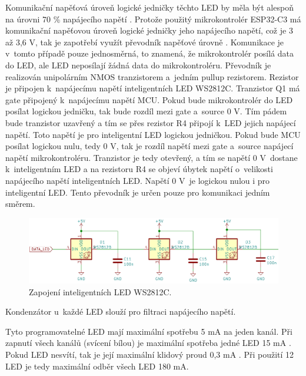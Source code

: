 Komunikační napěťová úroveň logické jedničky těchto LED by měla být alespoň na úrovni 70 \% napájecího napětí \cite{WS2812C_dtsh}. 
Protože použitý mikrokontrolér ESP32-C3 má komunikační napěťovou úroveň logické jedničky jeho napájecího napětí, což je 3 až 3,6 V, 
tak je zapotřebí využít převodník napěťové úrovně \cite{ESP_C3_dtsh}. Komunikace je v~tomto případě pouze jednosměrná, 
to znamená, že mikrokontrolér posílá data do LED, ale LED neposílají žádná data do mikrokontroléru. Převodník je realizován unipolárním 
NMOS tranzistorem 
a~jedním pullup rezistorem. Rezistor je připojen k~napájecímu napětí inteligentních LED WS2812C. 
Tranzistor Q1 má gate připojený k~napájecímu napětí MCU. Pokud bude mikrokontrolér do LED posílat logickou jedničku, tak bude rozdíl
mezi gate a~source 0 V. Tím pádem bude tranzistor uzavřený a tím se přes rezistor R4 připojí k~LED jejich napájecí napětí. Toto napětí 
je pro inteligentní LED logickou jedničkou. Pokud bude MCU posílat logickou nulu, tedy 0 V, tak je rozdíl napětí mezi gate a~source 
napájecí napětí mikrokontroléru. Tranzistor je tedy otevřený, a tím se napětí 0 V~dostane k~inteligentním LED a na rezistoru R4 se objeví
úbytek napětí o~velikosti napájecího napětí inteligentních LED. Napětí 0 V~je logickou nulou i pro inteligentní LED. Tento převodník
je určen pouze pro komunikaci jedním směrem. 

\begin{figure}[!h]
  \begin{center}
    \includegraphics[scale=0.5]{obrazky/WS2812C.png}
  \end{center}
  \caption[Zapojení inteligentních LED WS2812C]{Zapojení inteligentních LED WS2812C.}
\end{figure}

Kondenzátor u~každé LED slouží pro filtraci napájecího napětí. 

Tyto programovatelné LED mají maximální spotřebu 5 mA na jeden kanál. Při zapnutí všech kanálů (svícení bílou) je maximální
spotřeba jedné LED 15 mA \cite{WS2812C_dtsh}. Pokud LED nesvítí, tak je její maximální klidový proud 0,3 mA \cite{WS2812C_dtsh}.
Při použití 12 LED je tedy maximální odběr všech LED 180 mA.

